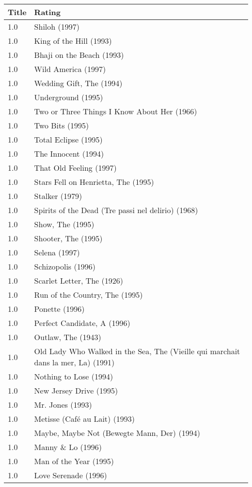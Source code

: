\begin{table}[h!]
\centering
\begin{tabular}{| l | l |}
\hline
Title & Rating \\
\hline
1.0 & Shiloh (1997) \\
1.0 & King of the Hill (1993) \\
1.0 & Bhaji on the Beach (1993) \\
1.0 & Wild America (1997) \\
1.0 & Wedding Gift, The (1994) \\
1.0 & Underground (1995) \\
1.0 & Two or Three Things I Know About Her (1966) \\
1.0 & Two Bits (1995) \\
1.0 & Total Eclipse (1995) \\
1.0 & The Innocent (1994) \\
1.0 & That Old Feeling (1997) \\
1.0 & Stars Fell on Henrietta, The (1995) \\
1.0 & Stalker (1979) \\
1.0 & Spirits of the Dead (Tre passi nel delirio) (1968) \\
1.0 & Show, The (1995) \\
1.0 & Shooter, The (1995) \\
1.0 & Selena (1997) \\
1.0 & Schizopolis (1996) \\
1.0 & Scarlet Letter, The (1926) \\
1.0 & Run of the Country, The (1995) \\
1.0 & Ponette (1996) \\
1.0 & Perfect Candidate, A (1996) \\
1.0 & Outlaw, The (1943) \\
1.0 & Old Lady Who Walked in the Sea, The (Vieille qui marchait dans la mer, La) (1991) \\
1.0 & Nothing to Lose (1994) \\
1.0 & New Jersey Drive (1995) \\
1.0 & Mr. Jones (1993) \\
1.0 & Metisse (Café au Lait) (1993) \\
1.0 & Maybe, Maybe Not (Bewegte Mann, Der) (1994) \\
1.0 & Manny \& Lo (1996) \\
1.0 & Man of the Year (1995) \\
1.0 & Love Serenade (1996) \\

\end{tabular}
\end{table}

